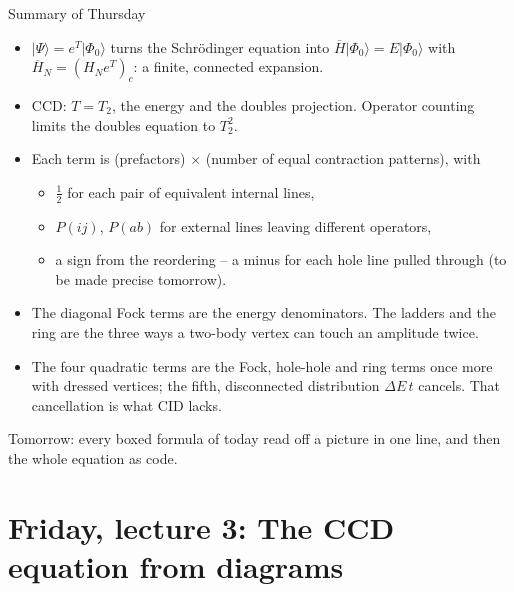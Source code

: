 \documentclass[aspectratio=169,10pt]{beamer}
\newcommand{\ket}[1]{\vert #1\rangle}
\newcommand{\ph}{\Phi_0}
\newcommand{\Hbar}{\overline{H}}
\begin{document}
\begin{frame}[shrink=3]{Summary of Thursday}
\begin{itemize}
\item $\ket{\Psi}=e^{T}\ket{\ph}$ turns the Schr\"odinger equation into $\Hbar\ket{\ph}=E\ket{\ph}$ with $\Hbar_N=(H_Ne^{T})_c$: a finite, connected expansion.
\item CCD: $T=T_2$, the energy and the doubles projection. Operator counting limits the doubles equation to $T_2^2$.
\item Each term is (prefactors) $\times$ (number of equal contraction patterns), with
\begin{itemize}
\item $\tfrac12$ for each pair of equivalent internal lines,
\item $P(ij)$, $P(ab)$ for external lines leaving different operators,
\item a sign from the reordering -- a minus for each hole line pulled through (to be made precise tomorrow).
\end{itemize}
\item The diagonal Fock terms are the energy denominators. The ladders and the ring are the three ways a two-body vertex can touch an amplitude twice.
\item The four quadratic terms are the Fock, hole-hole and ring terms once more with dressed vertices; the fifth, disconnected distribution $\Delta E\,t$ cancels. That cancellation is what CID lacks.
\end{itemize}
\vspace{0.3em}
\small Tomorrow: every boxed formula of today read off a picture in one line, and then the whole equation as code.
\end{frame}

\section[Friday 3: CCD with diagrams]{Friday, lecture 3: The CCD equation from diagrams}
\end{document}
